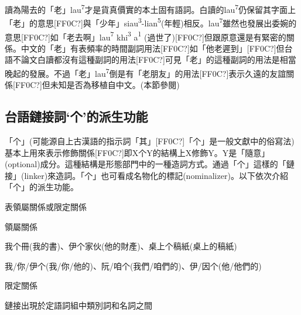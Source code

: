 \textrm{讀為陽去的「老」lau}\textrm{\textsuperscript{7}}\textrm{才是貨真價實的本土固有語詞。白讀的lau}\textrm{\textsuperscript{7}}\textrm{仍保留其字面上「老」的意思[FF0C?]與「少年」siau}\textrm{\textsuperscript{3}}\textrm{{}-lian}\textrm{\textsuperscript{5}}\textrm{(年輕)相反。lau}\textrm{\textsuperscript{7}}\textrm{雖然也發展出委婉的意思[FF0C?]如「老去啊」lau}\textrm{\textsuperscript{7}} \textrm{khi}\textrm{\textsuperscript{3}} \textrm{a}\textrm{\textsuperscript{1} }\textrm{(過世了)}[FF0C?]\textrm{但跟原意還是有緊密的關係。中文的「老」有表頻率的時間副詞用法[FF0C?]如「他老遲到」[FF0C?]但台語不論文白讀都沒有這種副詞的用法[FF0C?]可見「老」的這種副詞的用法是相當晚起的發展。不過「老」lau}\textrm{\textsuperscript{7}}\textrm{倒是有「老朋友」的用法[FF0C?]表示久遠的友誼關係[FF0C?]但未知是否為移植自中文。(本節參閱\citealt{Lien2001})}

\subsection{ 台語鏈接詞‘个’的派生功能}

\textrm{「个」(可能源自上古漢語的指示詞「其」[FF0C?]「个」是一般文獻中的俗寫法)基本上用來表示修飾關係[FF0C?]即X个Y的結構上X修飾Y}。\textrm{Y是「隨意」(optional)成分。這種結構是形態部門中的一種造詞方式。通過「个」這樣的「鏈接」(linker)來造詞。「个」也可看成名物化的標記(nominalizer)。以下依次介紹「个」的派生功能。}

\begin{listWWviiiNumxivleveli}
\item \begin{styleqwerty}\rmfamily
表領屬關係或限定關係
\end{styleqwerty}
\end{listWWviiiNumxivleveli}

\begin{listWWviiiNumxxleveli}
\item \begin{styleqwerty}\rmfamily
領屬關係
\end{styleqwerty}
\end{listWWviiiNumxxleveli}

\textrm{我个冊(我的書)}、\textrm{伊个家伙(他的財產)}、\textrm{桌上个稿紙(桌上的稿紙)}

\textrm{我/你/伊个(我/你/他的)}、\textrm{阮/咱个(我們/咱們的)}、\textrm{伊/因个(他/他們的)}

\begin{listWWviiiNumxxleveli}
\item \begin{styleqwerty}\rmfamily
限定關係
\end{styleqwerty}
\end{listWWviiiNumxxleveli}
\rmfamily
鏈接出現於定語詞組中類別詞和名詞之間

